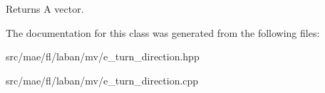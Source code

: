 \begin{DoxyReturn}{Returns}
A vector. 
\end{DoxyReturn}


The documentation for this class was generated from the following files\-:\begin{DoxyCompactItemize}
\item 
src/mae/fl/laban/mv/e\-\_\-turn\-\_\-direction.\-hpp\item 
src/mae/fl/laban/mv/e\-\_\-turn\-\_\-direction.\-cpp\end{DoxyCompactItemize}
